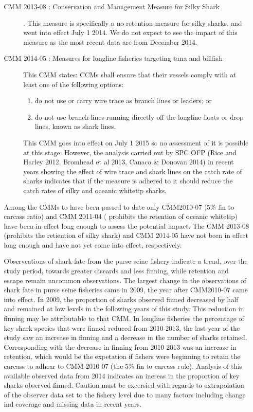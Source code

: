 \documentclass[12pt]{SCreport}
\begin{document}
\begin{description}
\item[CMM 2013-08 : Conservation and Management Measure for Silky Shark]. This measure is specifically a no retention measure for silky sharks, and went into effect July 1 2014. We do not expect to see the impact of this measure as the most recent data are from December 2014. 

\item[CMM 2014-05 : Measures for longline fisheries targeting tuna and billfish.] This CMM  states: 
      CCMs shall ensure that their vessels comply with at least one of the following options:
        \begin{enumerate}
            \item  do not use or carry wire trace as branch lines or leaders; or
            \item  do not use branch lines running directly off the longline floats or drop lines, known as shark lines. 
           \end{enumerate}
This CMM goes into effect on July 1 2015 so no assessment of it is possible at this stage. However, the analysis carried out by SPC OFP (Rice and Harley 2012, Bromhead et al 2013, Canaco \& Donovan 2014) in recent years showing the effect of wire trace and shark lines on the catch rate of sharks indicates that if the measure is adhered to it should reduce the catch rates of silky and oceanic whitetip sharks.

 \end{description}
Among the CMMs to have been passed to date only  CMM2010-07 (5\% fin to carcass ratio) and   CMM 2011-04 ( prohibits the retention of oceanic whitetip) have been in effect long enough to assess the potential impact.  The CMM 2013-08 (prohibits the retiention of silky shark)  and CMM 2014-05 have not been in effect long enough and  have not yet come into effect, respectively.   

Observeations of shark fate from the  purse seine fishery indicate   a trend, over the study period, towards  greater discards and less finning, while retention and escape remain  uncommon observations.  The largest change in the observations of shark fate in purse seine fisheries came in 2009, the year after  CMM2010-07 came into effect.  
In 2009, the proportion of sharks observed finned decreased by half and remained at low levels in the following years of this study.  This reduction in finning may be attributable to that CMM.   In longline fisheries the percentage of key shark species that were finned reduced from 2010-2013, the last year of the study saw an increase in finning and a decrease in the number of sharks retained.  Corresponding with the decrease in finning from 2010-2013 was an increase in retention, which would be the expetation if fishers were beginning to retain the carcass to adhear to CMM 2010-07 (the 5\% fin to carcass rule).      Analysis of this available observed data from 2014 indicates an increas in the proportion of key sharks observed finned.   Caution must be excersied with regards to extrapolation of the observer data set to the fishery level due to many factors including change ind coverage and missing data in recent years. 
\end{document}
